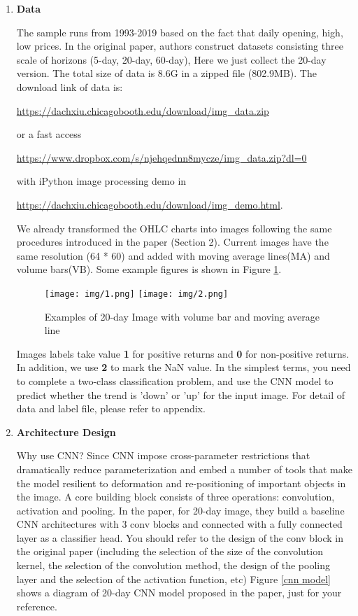 \documentclass[11pt]{article}
\begin{document}
\begin{enumerate}
    \item \textbf{Data}
    
    The sample runs from 1993-2019 based on the fact that daily opening, high, low prices. In the original paper, authors construct datasets consisting three scale of horizons (5-day, 20-day, 60-day), Here we just collect the 20-day version. The total size of data is 8.6G in a zipped file (802.9MB). The download link of data is: 
    
    \url{https://dachxiu.chicagobooth.edu/download/img_data.zip}
    
    or a fast access 
    
    \url{https://www.dropbox.com/s/njehqednn8mycze/img_data.zip?dl=0}
    
    with iPython image processing demo in 
    
    \url{https://dachxiu.chicagobooth.edu/download/img_demo.html}. 

    We already transformed the OHLC charts into images following the same procedures introduced in the paper (Section 2). Current images have the same resolution (64 * 60) and added with moving average lines(MA) and volume bars(VB). Some example figures is shown in Figure \ref{20-day image}.
    
    \begin{figure}
        \centering
        \texttt{[image: img/1.png]}
        \hspace{0.5in}
        \texttt{[image: img/2.png]}
        \caption{Examples of 20-day Image with volume bar and moving average line}
        \label{20-day image}
    \end{figure}


    Images labels take value \textbf{1} for positive returns and \textbf{0} for non-positive returns. In addition, we use \textbf{2} to mark the NaN value. In the simplest terms, you need to complete a two-class classification problem, and use the CNN model to predict whether the trend is 'down' or 'up' for the input image. For detail of data and label file, please refer to appendix.
    
    \item \textbf{Architecture Design}
    
    Why use CNN? Since CNN impose cross-parameter restrictions that dramatically reduce parameterization and embed a number of tools that make the model resilient to deformation and re-positioning of important objects in the image. A core building block consists of three operations: convolution, activation and pooling. In the paper, for 20-day image, they build a baseline CNN architectures with 3 conv blocks and connected with a fully connected layer as a classifier head. You should refer to the design of the conv block in the original paper (including the selection of the size of the convolution kernel, the selection of the convolution method, the design of the pooling layer and the selection of the activation function, etc) Figure \ref{cnn model} shows a diagram of 20-day CNN model proposed in the paper, just for your reference.
    

\end{enumerate}
\end{document}
